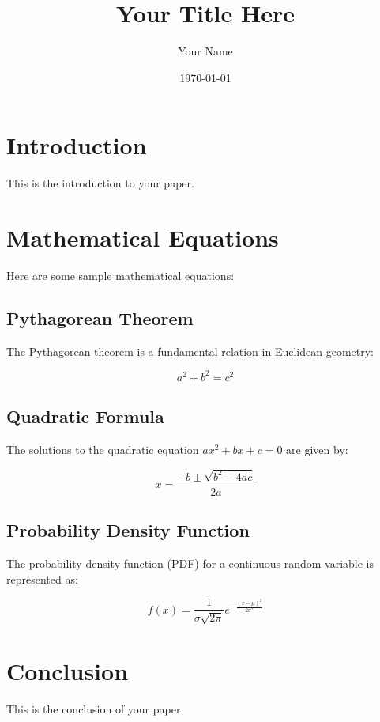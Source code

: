 \documentclass{article}
\title{Your Title Here}
\author{Your Name}
\date{\today}
\begin{document}
\maketitle

\section{Introduction}

This is the introduction to your paper.

\section{Mathematical Equations}

Here are some sample mathematical equations:

\subsection{Pythagorean Theorem}

The Pythagorean theorem is a fundamental relation in Euclidean geometry:

\begin{equation}
a^2 + b^2 = c^2
\end{equation}

\subsection{Quadratic Formula}

The solutions to the quadratic equation $ax^2 + bx + c = 0$ are given by:

\begin{equation}
x = \frac{-b \pm \sqrt{b^2 - 4ac}}{2a}
\end{equation}

\subsection{Probability Density Function}

The probability density function (PDF) for a continuous random variable is represented as:

\begin{equation}
f(x) = \frac{1}{\sigma \sqrt{2\pi}} e^{-\frac{(x - \mu)^2}{2\sigma^2}}
\end{equation}

\section{Conclusion}

This is the conclusion of your paper.
\end{document}
